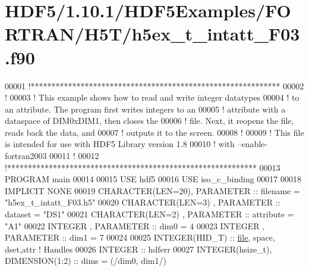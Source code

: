 \hypertarget{_h_d_f5_21_810_81_2_h_d_f5_examples_2_f_o_r_t_r_a_n_2_h5_t_2h5ex__t__intatt___f03_8f90_source}{}\section{H\+D\+F5/1.10.1/\+H\+D\+F5\+Examples/\+F\+O\+R\+T\+R\+A\+N/\+H5\+T/h5ex\+\_\+t\+\_\+intatt\+\_\+\+F03.f90}
\label{_h_d_f5_21_810_81_2_h_d_f5_examples_2_f_o_r_t_r_a_n_2_h5_t_2h5ex__t__intatt___f03_8f90_source}

\begin{DoxyCode}
00001 \textcolor{comment}{!************************************************************}
00002 \textcolor{comment}{!}
00003 \textcolor{comment}{!  This example shows how to read and write integer datatypes}
00004 \textcolor{comment}{!  to an attribute.  The program first writes integers to an}
00005 \textcolor{comment}{!  attribute with a dataspace of DIM0xDIM1, then closes the}
00006 \textcolor{comment}{!  file.  Next, it reopens the file, reads back the data, and}
00007 \textcolor{comment}{!  outputs it to the screen.}
00008 \textcolor{comment}{!}
00009 \textcolor{comment}{!  This file is intended for use with HDF5 Library version 1.8}
00010 \textcolor{comment}{!  with --enable-fortran2003}
00011 \textcolor{comment}{!}
00012 \textcolor{comment}{!************************************************************}
00013 \textcolor{keyword}{PROGRAM} main
00014 
00015   \textcolor{keywordtype}{USE }hdf5
00016   \textcolor{keywordtype}{USE }iso\_c\_binding
00017 
00018   \textcolor{keywordtype}{IMPLICIT NONE}
00019   \textcolor{keywordtype}{CHARACTER(LEN=20)}, \textcolor{keywordtype}{PARAMETER} :: filename  = \textcolor{stringliteral}{"h5ex\_t\_intatt\_F03.h5"}
00020   \textcolor{keywordtype}{CHARACTER(LEN=3)} , \textcolor{keywordtype}{PARAMETER} :: dataset   = \textcolor{stringliteral}{"DS1"}
00021   \textcolor{keywordtype}{CHARACTER(LEN=2)} , \textcolor{keywordtype}{PARAMETER} :: attribute = \textcolor{stringliteral}{"A1"}
00022   \textcolor{keywordtype}{INTEGER}          , \textcolor{keywordtype}{PARAMETER} :: dim0      = 4
00023   \textcolor{keywordtype}{INTEGER}          , \textcolor{keywordtype}{PARAMETER} :: dim1      = 7
00024 
00025   \textcolor{keywordtype}{INTEGER(HID\_T)}  :: \hyperlink{structfile}{file}, space, dset,attr \textcolor{comment}{! Handles}
00026   \textcolor{keywordtype}{INTEGER} :: hdferr
00027   \textcolor{keywordtype}{INTEGER(hsize\_t)},   \textcolor{keywordtype}{DIMENSION(1:2)} :: dims = (/dim0, dim1/)

\end{DoxyCode}
